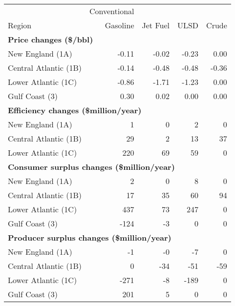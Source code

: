 \begin{tabular}{lrrrr}
  \hline
   & Conventional & &  & \\

                    Region & Gasoline & Jet Fuel & ULSD & Crude \\ 
                    \midrule \multicolumn{5}{l}{\textbf{Price changes (\$/bbl)}} \\
New England (1A) & -0.11 & -0.02 & -0.23 & 0.00 \\ 
  Central Atlantic (1B) & -0.14 & -0.48 & -0.48 & -0.36 \\ 
  Lower Atlantic (1C) & -0.86 & -1.71 & -1.23 & 0.00 \\ 
  Gulf Coast (3) & 0.30 & 0.02 & 0.00 & 0.00 \\ 
   \midrule \multicolumn{5}{l}{\textbf{Efficiency changes (\$million/year)}} \\
New England (1A) & 1 & 0 & 2 & 0 \\ 
  Central Atlantic (1B) & 29 & 2 & 13 & 37 \\ 
  Lower Atlantic (1C) & 220 & 69 & 59 & 0 \\ 
   \midrule \multicolumn{5}{l}{\textbf{Consumer surplus changes (\$million/year)}} \\
New England (1A) & 2 & 0 & 8 & 0 \\ 
  Central Atlantic (1B) & 17 & 35 & 60 & 94 \\ 
  Lower Atlantic (1C) & 437 & 73 & 247 & 0 \\ 
  Gulf Coast (3) & -124 & -3 & 0 & 0 \\ 
   \midrule \multicolumn{5}{l}{\textbf{Producer surplus changes (\$million/year)}} \\
New England (1A) & -1 & -0 & -7 & 0 \\ 
  Central Atlantic (1B) & 0 & -34 & -51 & -59 \\ 
  Lower Atlantic (1C) & -271 & -8 & -189 & 0 \\ 
  Gulf Coast (3) & 201 & 5 & 0 & 0 \\ 
   \hline
\end{tabular}
